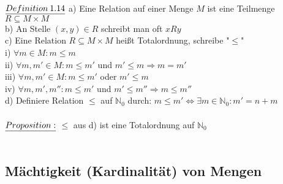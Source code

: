 \documentclass[fleqn, a4paper, 11pt]{article}
\begin{document}
\\
$\uline{Definition\:1.14}$ a) Eine Relation auf einer Menge $M$ ist eine Teilmenge $R\subseteq M\times M$\\
b) An Stelle $(x,y)\in R$ schreibt man oft $xRy$\\
c) Eine Relation $R\subseteq M\times M$ hei\ss{}t Totalordnung, schreibe "$\leq$"\\
i) $\forall m\in M:m\leq m$\\
ii) $\forall m,m'\in M:m\leq m'$ und $m'\leq m\Rightarrow m=m'$\\
iii) $\forall m,m'\in M:m\leq m'$ oder $m'\leq m$\\
iv) $\forall m,m',m'':m\leq m'$ und $m'\leq m''\Rightarrow m\leq m''$\\
d) Definiere Relation $\leq$ auf $\mathbb{N}_{0}$ durch: $m\leq m'\Leftrightarrow\exists m\in\mathbb{N}_{0}:m'=n+m$\\
\\
$\uline{Proposition:}$ $\leq$ aus d) ist eine Totalordnung auf $\mathbb{N}_{0}$\\
\\
\subsection{M\"achtigkeit (Kardinalit\"at) von Mengen}
\end{document}
